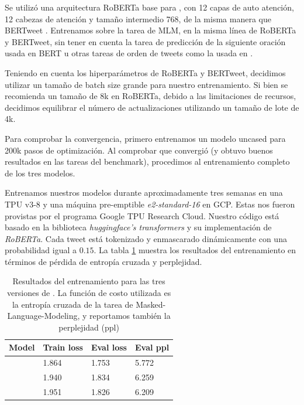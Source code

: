 Se utilizó una arquitectura RoBERTa base para \robertuito{}, con 12 capas de auto atención, 12 cabezas de atención y tamaño intermedio 768, de la misma manera que BERTweet \cite{bertweet}. Entrenamos sobre la tarea de MLM, en la misma línea de RoBERTa y BERTweet, sin tener en cuenta la tarea de predicción de la siguiente oración usada en BERT u otras tareas de orden de tweets como la usada en \citet{gonzalez2021twilbert}.

Teniendo en cuenta los hiperparámetros de RoBERTa y BERTweet, decidimos utilizar un tamaño de batch size grande para nuestro entrenamiento. Si bien se recomienda un tamaño de 8k en RoBERTa, debido a las limitaciones de recursos, decidimos equilibrar el número de actualizaciones utilizando un tamaño de lote de 4k.

Para comprobar la convergencia, primero entrenamos un modelo uncased para 200k pasos de optimización. Al comprobar que convergió (y obtuvo buenos resultados en las tareas del benchmark), procedimos al entrenamiento completo de los tres modelos.

Entrenamos nuestros modelos durante aproximadamente tres semanas en una TPU v3-8 y una máquina pre-emptible \emph{e2-standard-16} en GCP. Estas nos fueron provistas por el programa Google TPU Research Cloud. Nuestro código está basado en la biblioteca \emph{huggingface's transformers}\cite{wolf-etal-2020-transformers} y su implementación de \emph{RoBERTa}. Cada tweet está tokenizado y enmascarado dinámicamente con una probabilidad igual a $ 0.15 $. La tabla \ref{tab:training_results} muestra los resultados del entrenamiento en términos de pérdida de entropía cruzada y perplejidad.

\begin{table}[h]
    \centering
    \begin{tabular}{l|l l l|}
        Model   & Train loss & Eval loss   & Eval ppl \\
        \hline
        \cased{}   & 1.864      & 1.753       & 5.772    \\
        \uncased{} & 1.940      & 1.834       & 6.259    \\
        \deacc{}   & 1.951      & 1.826       & 6.209
    \end{tabular}
    \caption{Resultados del entrenamiento para las tres versiones de \robertuito{}. La función de costo utilizada es la entropía cruzada de la tarea de Masked-Language-Modeling, y reportamos también la perplejidad (ppl)}
    \label{tab:training_results}
\end{table}


